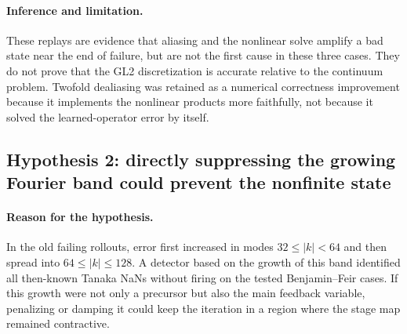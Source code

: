 \documentclass[11pt]{article}
\begin{document}
\paragraph{Inference and limitation.}
These replays are evidence that aliasing and the nonlinear solve amplify a
bad state near the end of failure, but are not the first cause in these three
cases.  They do not prove that the GL2 discretization is accurate relative to
the continuum problem.  Twofold dealiasing was retained as a numerical
correctness improvement because it implements the nonlinear products more
faithfully, not because it solved the learned-operator error by itself.

\subsection{Hypothesis 2: directly suppressing the growing Fourier band could
prevent the nonfinite state}

\paragraph{Reason for the hypothesis.}
In the old failing rollouts, error first increased in modes
$32\leq |k|<64$ and then spread into $64\leq|k|\leq128$.  A detector based on
the growth of this band identified all then-known Tanaka NaNs without firing
on the tested Benjamin--Feir cases.  If this growth were not only a precursor
but also the main feedback variable, penalizing or damping it could keep the
iteration in a region where the stage map remained contractive.
\end{document}
